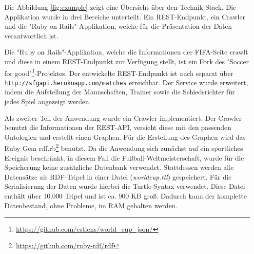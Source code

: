 \documentclass[runningheads,a4paper]{llncs}
\begin{document}
Die Abbildung \ref{fig:example} zeigt eine Übersicht über den Technik-Stack. Die Applikation wurde in drei Bereiche unterteilt. Ein REST-Endpunkt, ein Crawler und die "Ruby on Rails"{}-Applikation, welche für die Präsentation der Daten verantwortlich ist.

Die "Ruby on Rails"{}-Applikation, welche die Informationen der FIFA-Seite crawlt und diese in einem REST-Endpunkt zur Verfügung stellt, ist ein Fork des "Soccer for good"\footnote{\url{https://github.com/estiens/world_cup_json/}}-Projektes. Der entwickelte REST-Endpunkt ist auch separat über \texttt{http://sfgapi.herokuapp.com/matches} erreichbar. Der Service wurde erweitert, indem die Aufstellung der Mannschaften, Trainer sowie die Schiedsrichter für jedes Spiel angezeigt werden. 

Als zweiter Teil der Anwendung wurde ein Crawler implementiert. Der Crawler benutzt die Informationen der REST-API, versieht diese mit den passenden Ontologien und erstellt einen Graphen. Für die Erstellung des Graphen wird das Ruby Gem rdf.rb\footnote{\url{https://github.com/ruby-rdf/rdf}} benutzt. Da die Anwendung sich zunächst auf ein sportliches Ereignis beschränkt, in diesem Fall die Fußball-Weltmeisterschaft, wurde für die Speicherung keine zusätzliche Datenbank verwendet. Stattdessen werden alle Datensätze als RDF-Tripel in einer Datei (\textit{worldcup.ttl}) gespeichert. Für die Serialisierung der Daten wurde hierbei die Turtle-Syntax verwendet. Diese Datei enthält über 10.000 Tripel und ist ca. 900 KB groß. Dadurch kann der komplette Datenbestand, ohne Probleme, im RAM gehalten werden.
\end{document}
